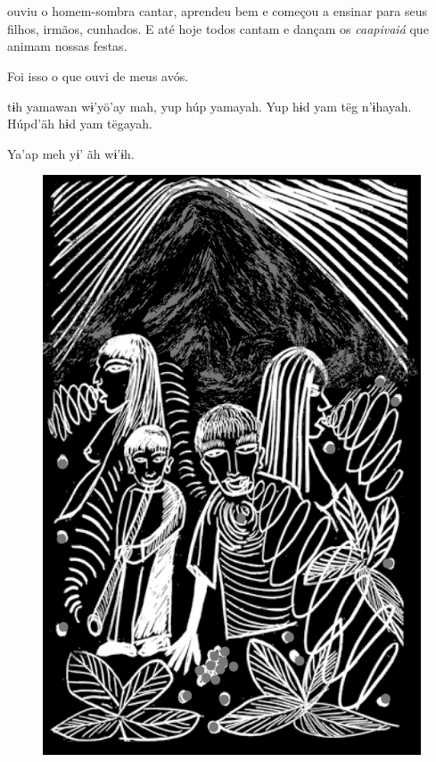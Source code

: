 \chapter*{}

\mbox{}\vspace*{\fill}

 ouviu o homem-sombra cantar,
aprendeu bem e
começou a ensinar
para seus filhos,
irmãos, cunhados.
E até hoje todos
cantam e dançam os
\textit{caapivaiá} que animam
nossas festas.

\medskip

Foi isso o que ouvi de
meus avós.

\vspace{2em}

 tɨh yamawan
wɨ’yö’ay mah, yup húp
yamayah. Yup hɨd yam
tëg n’ɨhayah. Húpd’äh
hɨd yam tëgayah.

\medskip

Ya’ap meh yɨ’ ãh wɨ’ɨh.

\vspace*{\fill}

\begin{figure}
\vspace*{-2cm}
\hspace*{-2.4cm}\includegraphics[width=142mm]{./imgs/img9.jpg}
\end{figure}

